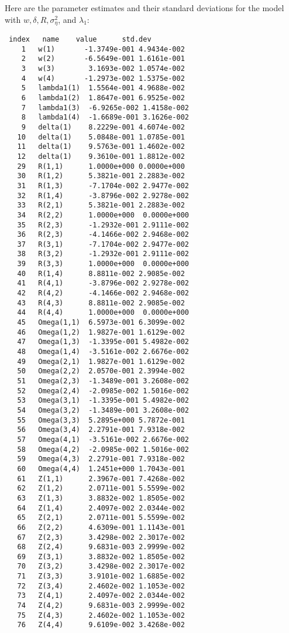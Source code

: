 Here are the parameter estimates and their standard deviations for
the model with $w,\delta,R,\sigma^2_\eta$, and $\lambda_1$:
\begin{lstlisting}
 index   name    value      std.dev   
    1   w(1)       -1.3749e-001 4.9434e-002
    2   w(2)       -6.5649e-001 1.6161e-001
    3   w(3)        3.1693e-002 1.0574e-002
    4   w(4)       -1.2973e-002 1.5375e-002
    5   lambda1(1)  1.5564e-001 4.9688e-002
    6   lambda1(2)  1.8647e-001 6.9525e-002
    7   lambda1(3)  -6.9265e-002 1.4158e-002
    8   lambda1(4)  -1.6689e-001 3.1626e-002
    9   delta(1)    8.2229e-001 4.6074e-002
   10   delta(1)    5.0848e-001 1.0785e-001
   11   delta(1)    9.5763e-001 1.4602e-002
   12   delta(1)    9.3610e-001 1.8812e-002
   29   R(1,1)      1.0000e+000 0.0000e+000
   30   R(1,2)      5.3821e-001 2.2883e-002
   31   R(1,3)      -7.1704e-002 2.9477e-002
   32   R(1,4)      -3.8796e-002 2.9278e-002
   33   R(2,1)      5.3821e-001 2.2883e-002
   34   R(2,2)      1.0000e+000  0.0000e+000
   35   R(2,3)      -1.2932e-001 2.9111e-002
   36   R(2,3)      -4.1466e-002 2.9468e-002
   37   R(3,1)      -7.1704e-002 2.9477e-002
   38   R(3,2)      -1.2932e-001 2.9111e-002
   39   R(3,3)      1.0000e+000  0.0000e+000
   40   R(1,4)      8.8811e-002 2.9085e-002
   41   R(4,1)      -3.8796e-002 2.9278e-002
   42   R(4,2)      -4.1466e-002 2.9468e-002
   43   R(4,3)      8.8811e-002 2.9085e-002
   44   R(4,4)      1.0000e+000  0.0000e+000
   45   Omega(1,1)  6.5973e-001 6.3099e-002
   46   Omega(1,2)  1.9827e-001 1.6129e-002
   47   Omega(1,3)  -1.3395e-001 5.4982e-002
   48   Omega(1,4)  -3.5161e-002 2.6676e-002
   49   Omega(2,1)  1.9827e-001 1.6129e-002
   50   Omega(2,2)  2.0570e-001 2.3994e-002
   51   Omega(2,3)  -1.3489e-001 3.2608e-002
   52   Omega(2,4)  -2.0985e-002 1.5016e-002
   53   Omega(3,1)  -1.3395e-001 5.4982e-002
   54   Omega(3,2)  -1.3489e-001 3.2608e-002
   55   Omega(3,3)  5.2895e+000 5.7872e-001
   56   Omega(3,4)  2.2791e-001 7.9318e-002
   57   Omega(4,1)  -3.5161e-002 2.6676e-002
   58   Omega(4,2)  -2.0985e-002 1.5016e-002
   59   Omega(4,3)  2.2791e-001 7.9318e-002
   60   Omega(4,4)  1.2451e+000 1.7043e-001
   61   Z(1,1)      2.3967e-001 7.4268e-002
   62   Z(1,2)      2.0711e-001 5.5599e-002
   63   Z(1,3)      3.8832e-002 1.8505e-002
   64   Z(1,4)      2.4097e-002 2.0344e-002
   65   Z(2,1)      2.0711e-001 5.5599e-002
   66   Z(2,2)      4.6309e-001 1.1143e-001
   67   Z(2,3)      3.4298e-002 2.3017e-002
   68   Z(2,4)      9.6831e-003 2.9999e-002
   69   Z(3,1)      3.8832e-002 1.8505e-002
   70   Z(3,2)      3.4298e-002 2.3017e-002
   71   Z(3,3)      3.9101e-002 1.6885e-002
   72   Z(3,4)      2.4602e-002 1.1053e-002
   73   Z(4,1)      2.4097e-002 2.0344e-002
   74   Z(4,2)      9.6831e-003 2.9999e-002
   75   Z(4,3)      2.4602e-002 1.1053e-002
   76   Z(4,4)      9.6109e-002 3.4268e-002
\end{lstlisting}

